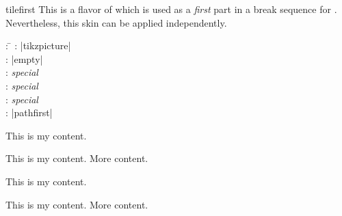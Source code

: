 \clearpage
\begin{docSkin}[doc new=2016-02-25]{tilefirst}
This is a flavor of  which is used as a \emph{first} part
in a break sequence for .
Nevertheless, this skin can be applied independently.
\begin{tcolorbox}[skintable=tilefirst]
  \begin{tabbing}
    : \=\kill
    :  \> |tikzpicture|\\ 
    :           \> |empty|\\
    : \> \emph{special}\\ 
    :        \> \emph{special}\\
    :    \> \emph{special}\\
    :           \> |pathfirst|
  \end{tabbing}
\end{tcolorbox}
\end{docSkin}

\begin{dispExample}
\begin{tcbraster}[skin=tilefirst,raster equal height,raster columns=4,
    colback=LightGreen,colframe=DarkGreen,colbacklower=LimeGreen!75!LightGreen,
    colbacktitle=LimeGreen!75!DarkGreen,
    left=1mm,right=1mm,top=1mm,bottom=1mm,middle=1mm,boxrule=0pt]
  \begin{tcolorbox}
    This is my content.
  \end{tcolorbox}
  \begin{tcolorbox}
    This is my content.
    \tcblower
    More content.
  \end{tcolorbox}
  \begin{tcolorbox}[adjusted title=My title]
    This is my content.
  \end{tcolorbox}
  \begin{tcolorbox}[adjusted title=My title]
    This is my content.
    \tcblower
    More content.
  \end{tcolorbox}
\end{tcbraster}
\end{dispExample}


